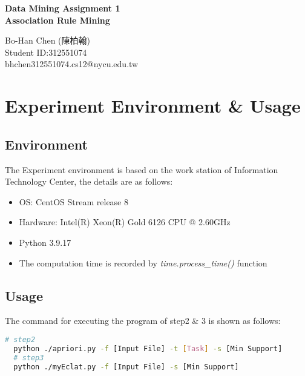 \documentclass[a4paper, oneside, final, 12pt]{scrartcl} %
\begin{document}


\begin{center}
    {\fontsize{18}{30}\textbf{Data Mining Assignment 1 \\ Association Rule Mining}}
\end{center}

\begin{center}
  Bo-Han Chen (陳柏翰) \\
  Student ID:312551074 \\
  bhchen312551074.cs12@nycu.edu.tw
\end{center}

\section{Experiment Environment \& Usage}

\begingroup
\raggedright

\subsection{Environment}

The Experiment environment is based on the work station of Information Technology Center,
the details are as follows:
\begin{itemize}
  \item OS: CentOS Stream release 8
  \item Hardware: Intel(R) Xeon(R) Gold 6126 CPU @ 2.60GHz
  \item Python 3.9.17
  \item The computation time is recorded by \emph{time.process\_time()} function
\end{itemize}

\subsection{Usage}

The command for executing the program of step2 \& 3 is shown as follows:

\begin{lstlisting}[language=bash]
  # step2
  python ./apriori.py -f [Input File] -t [Task] -s [Min Support]
  # step3
  python ./myEclat.py -f [Input File] -s [Min Support]
\end{lstlisting}
\end{document}
